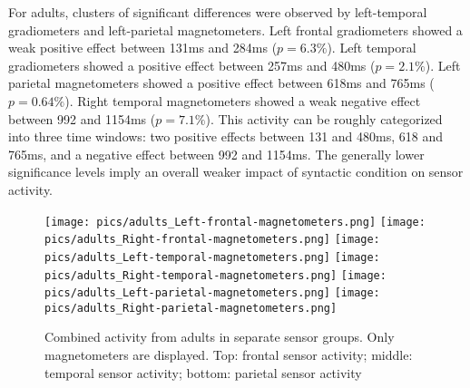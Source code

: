 For adults, clusters of significant differences were observed by left-temporal gradiometers and left-parietal magnetometers.
Left frontal gradiometers showed a weak positive effect between 131ms and 284ms ($p = 6.3\%$).
Left temporal gradiometers showed a positive effect between 257ms and 480ms ($p = 2.1\%$).
Left parietal magnetometers showed a positive effect between 618ms and 765ms ($p = 0.64\%$).
Right temporal magnetometers showed a weak negative effect between 992 and 1154ms ($p = 7.1\%$).
This activity can be roughly categorized into three time windows: two positive effects between 131 and 480ms, 618 and 765ms, and a negative effect between 992 and 1154ms.
The generally lower significance levels imply an overall weaker impact of syntactic condition on sensor activity.

\begin{figure}[h]
\begin{center}
\vspace{7mm}
\texttt{[image: pics/adults\_Left-frontal-magnetometers.png]}
\texttt{[image: pics/adults\_Right-frontal-magnetometers.png]}
\texttt{[image: pics/adults\_Left-temporal-magnetometers.png]}
\texttt{[image: pics/adults\_Right-temporal-magnetometers.png]}
\texttt{[image: pics/adults\_Left-parietal-magnetometers.png]}
\texttt{[image: pics/adults\_Right-parietal-magnetometers.png]}
\caption{\label{4.2.activity.adults} Combined activity from adults in separate sensor groups. Only magnetometers are displayed. Top: frontal sensor activity; middle: temporal sensor activity; bottom: parietal sensor activity}
\end{center}
\end{figure}